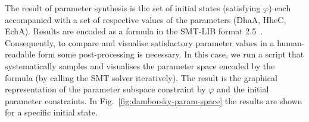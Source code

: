 \documentclass{llncs}
\begin{document}

The result of parameter synthesis is the set of initial states (satisfying $\varphi$) each accompanied with a set of respective values of the parameters (DhaA, HheC, EchA). Results are encoded as a formula in the SMT-LIB format 2.5~\cite{smtlib25}. %
Consequently, to compare and visualise satisfactory parameter values in a human-readable form 
some post-processing is necessary. In this case, we run a script that systematically samples and visualises the parameter space encoded by the formula (by calling the SMT solver iteratively). The result is the graphical representation of the parameter subspace constraint by $\varphi$ and the initial parameter constraints. In Fig.~\ref{fig:damborsky-param-space} the results are shown for a specific initial state. 
\end{document}
